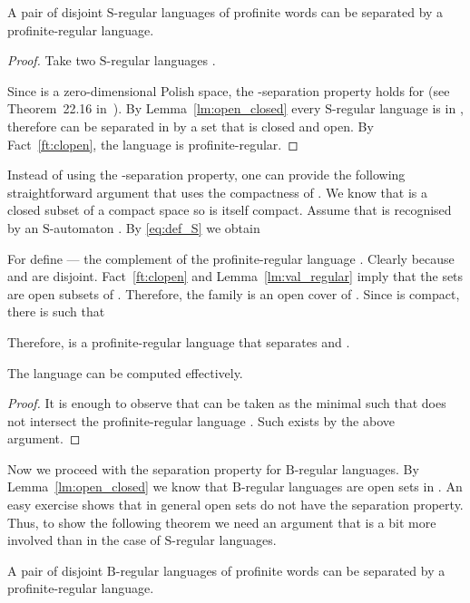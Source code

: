\documentclass{LMCS}
\newcommand{\fB}{\ensuremath{\mathrm{B}}\xspace}
\newcommand{\fS}{\ensuremath{\mathrm{S}}\xspace}
\begin{document}
\begin{lemma}\label{lm:s_separation}
A pair of disjoint \fS-regular languages of profinite words can be separated by a profinite-regular language.
\end{lemma}

\begin{proof}
Take two \fS-regular languages .

Since  is a zero-dimensional Polish space, the -separation property holds for  (see Theorem~22.16 in~\cite{kechris_descriptive}). By Lemma~\ref{lm:open_closed} every \fS-regular language is  in , therefore  can be separated in  by a set  that is closed and open. By Fact~\ref{ft:clopen}, the language  is profinite-regular.
\end{proof}

Instead of using the -separation property, one can provide the following straightforward argument that uses the compactness of . We know that  is a closed subset of a compact space  so  is itself compact. Assume that  is recognised by an \fS-automaton . By \eqref{eq:def_S} we obtain


For  define  ---  the complement of the profinite-regular language . Clearly  because  and  are disjoint. Fact~\ref{ft:clopen} and Lemma~\ref{lm:val_regular} imply that the sets  are open subsets of . Therefore, the family  is an open cover of . Since  is compact, there is  such that


Therefore,  is a profinite-regular language that separates  and .

\begin{remark}\label{rm:effect_S}
The language  can be computed effectively.
\end{remark}

\begin{proof}
It is enough to observe that  can be taken as the minimal  such that  does not intersect the profinite-regular language . Such  exists by the above argument.
\end{proof}

Now we proceed with the separation property for \fB-regular languages. By Lemma~\ref{lm:open_closed} we know that \fB-regular languages are open sets in . An easy exercise shows that in general open sets do not have the separation property. Thus, to show the following theorem we need an argument that is a bit more involved than in the case of \fS-regular languages.

\begin{theorem}\label{th:b_separation}
A pair of disjoint \fB-regular languages of profinite words can be separated by a profinite-regular language.
\end{theorem}
\end{document}
